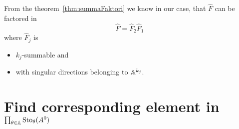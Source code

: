 From the theorem~\ref{thm:summaFaktori} we know in our case, that $\hat F$ can
be factored in
\[
  \hat F=\hat F_2 \hat F_1
\]
where $\hat F_j$ is
\begin{itemize}
  \item $k_j$-summable and
  \item with singular directions belonging to $\mathbb{A}^{k_j}$.
\end{itemize}

\section{Find corresponding element in $\prod_{\theta\in\mathbb{A}}\operatorname{Sto}_\theta(A^0)$}
\begin{comment}
  needs \textbf{summability}?
  \begin{itemize}
    \item \cite[9]{thboalch} (only mentions multisummability)
    \item \cite[III.2]{Loday1994}
    \item \cite{Loday2014}
  \end{itemize}
\end{comment}

